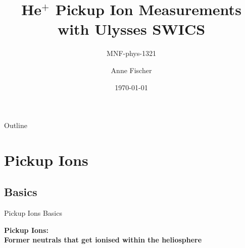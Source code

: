 \documentclass{beamer}
\title{He$^+$ Pickup Ion Measurements\\ with Ulysses SWICS}
\subtitle{MNF-phys-1321}
\author{Anne Fischer}
\date{\today}
\begin{document}
\begin{frame}[plain]
	\titlepage
\end{frame}
\begin{frame}[plain]{Outline}
	
	\tableofcontents
\end{frame}
\section{Pickup Ions}
\subsection{Basics}
\begin{frame}{Pickup Ions Basics}
	\begin{block}{ }
		\textbf{Pickup Ions: \\
			Former neutrals that get ionised within the heliosphere}
	\end{block}


\end{frame}
\end{document}

